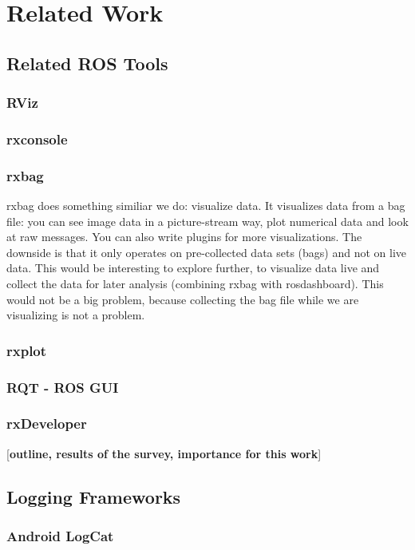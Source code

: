 \chapter{Related Work}

\section{Related ROS Tools}
\label{related_ros_tools}
\subsection{RViz}
\subsection{rxconsole}
\subsection{rxbag}
rxbag does something similiar we do: visualize data. It visualizes data from a bag file: you can see image data in a picture-stream way, plot numerical data and look at raw messages. You can also write plugins for more visualizations. The downside is that it only operates on pre-collected data sets (bags) and not on live data. This would be interesting to explore further, to visualize data live and collect the data for later analysis (combining rxbag with rosdashboard). This would not be a big problem, because collecting the bag file while we are visualizing is not a problem.

\subsection{rxplot}
\subsection{RQT - ROS GUI}
\subsection{rxDeveloper}
[\textbf{outline, results of the survey, importance for this work}]
\cite{Muellers2012}

\section{Logging Frameworks}
\subsection{Android LogCat}
